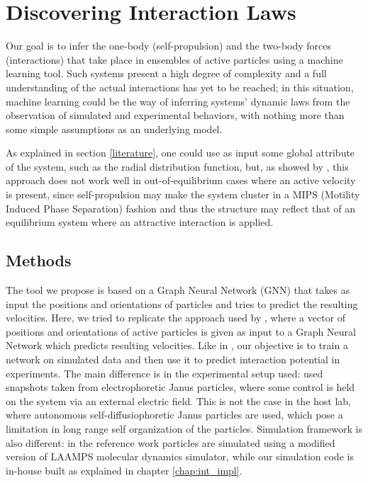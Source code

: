 \documentclass[../../master_thesis_np.tex]{subfiles}
\begin{document}
\chapter{Discovering Interaction Laws}
Our goal is to infer the one-body (self-propulsion) and the two-body forces (interactions) that take place in ensembles of active particles using a machine learning tool.
Such systems present a high degree of complexity and a full understanding of the actual interactions has yet to be reached; in this situation, machine learning could be the way of inferring systems' dynamic laws from the observation of simulated and experimental behaviors, with nothing more than some simple assumptions as an underlying model.

As explained in section \ref{literature}, one could use as input some global attribute of the system, such as the radial distribution function, but, as showed by \citeauthor{bag_interaction_2021} \cite{bag_interaction_2021}, this approach does not work well in out-of-equilibrium cases where an active velocity is present, since self-propulsion may make the system cluster in a MIPS (Motility Induced Phase Separation) fashion and thus the structure may reflect that of an equilibrium system where an attractive interaction is applied.

\section{Methods}
The tool we propose is based on a Graph Neural Network (GNN) that takes as input the positions and orientations of particles and tries to predict the resulting velocities.
Here, we tried to replicate the approach used by \citeauthor{ruiz-garcia_discovering_2024} \cite{ruiz-garcia_discovering_2024}, where a vector of positions and orientations of active particles is given as input to a Graph Neural Network which predicts resulting velocities.
Like in \cite{ruiz-garcia_discovering_2024}, our objective is to train a network on simulated data and then use it to predict interaction potential in experiments.
The main difference is in the experimental setup used: \citeauthor{ruiz-garcia_discovering_2024} used snapshots taken from electrophoretic Janus particles, where some control is held on the system via an external electric field.
This is not the case in the host lab, where autonomous self-diffusiophoretic Janus particles are used, which pose a limitation in long range self organization of the particles.
Simulation framework is also different: in the reference work particles are simulated using a modified version of LAAMPS \cite{thompson_lammps_2022} molecular dynamics simulator, while our simulation code is in-house built as explained in chapter \ref{chap:int_impl}.
\end{document}

